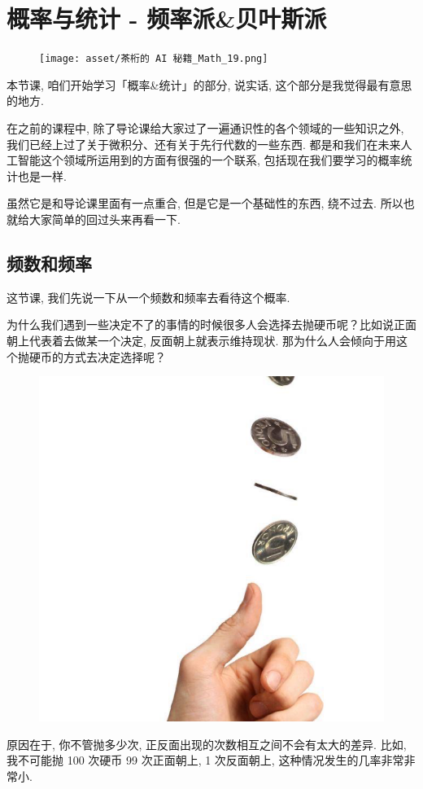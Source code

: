 \chapter{概率与统计 - 频率派\&贝叶斯派}
\begin{figure}[ht]
  \centering
  \texttt{[image: asset/茶桁的 AI 秘籍\_Math\_19.png]}
\end{figure}

\newpage

本节课, 咱们开始学习「概率\&统计」的部分, 说实话, 这个部分是我觉得最有意思的地方. 

在之前的课程中, 除了导论课给大家过了一遍通识性的各个领域的一些知识之外, 我们已经上过了关于微积分、还有关于先行代数的一些东西. 都是和我们在未来人工智能这个领域所运用到的方面有很强的一个联系, 包括现在我们要学习的概率统计也是一样. 

虽然它是和导论课里面有一点重合, 但是它是一个基础性的东西, 绕不过去. 所以也就给大家简单的回过头来再看一下. 

\section{频数和频率}

这节课, 我们先说一下从一个频数和频率去看待这个概率. 

为什么我们遇到一些决定不了的事情的时候很多人会选择去抛硬币呢？比如说正面朝上代表着去做某一个决定, 反面朝上就表示维持现状. 那为什么人会倾向于用这个抛硬币的方式去决定选择呢？

\begin{figure}[ht]
  \centering
  \includegraphics[width=0.5\linewidth]{asset/20230915222104.png}
  \caption{}
  \label{fig:img20_1}
\end{figure}

原因在于, 你不管抛多少次, 正反面出现的次数相互之间不会有太大的差异. 比如, 我不可能抛 100 次硬币 99 次正面朝上, 1 次反面朝上, 这种情况发生的几率非常非常小. 

